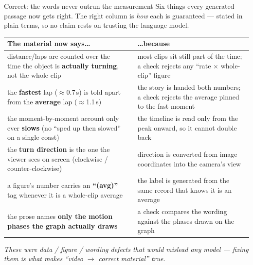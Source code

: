 \documentclass[aspectratio=169,10pt]{beamer}
\newcommand{\ok}{{\color{cApp}\textbf{\checkmark}}}
\newcommand{\takeaway}[1]{\vfill{\footnotesize\itshape\color{cGrey}#1\par}}
\begin{document}
\begin{frame}{Correct: the words never outrun the measurement}
\small
Six things every generated passage now gets right. The right column is \emph{how} each is guaranteed
--- stated in plain terms, so no claim rests on trusting the language model.
\vspace{0.3em}
\scriptsize
\renewcommand{\arraystretch}{1.45}
\begin{tabular}{@{}p{6.6cm}cp{5.6cm}@{}}
\toprule
\textbf{The material now says\ldots} & & \textbf{\ldots because} \\
\midrule
distance/laps are counted over the time the object is \textbf{actually turning}, not the whole clip &
\ok & most clips sit still part of the time; a check rejects any ``rate $\times$ whole-clip'' figure \\
the \textbf{fastest} lap ($\approx$0.7\,s) is told apart from the \textbf{average} lap ($\approx$1.1\,s) &
\ok & the story is handed both numbers; a check rejects the average pinned to the fast moment \\
the moment-by-moment account only ever \textbf{slows} (no ``sped up then slowed'' on a single coast) &
\ok & the timeline is read only from the peak onward, so it cannot double back \\
the \textbf{turn direction} is the one the viewer sees on screen (clockwise / counter-clockwise) &
\ok & direction is converted from image coordinates into the camera's view \\
a figure's number carries an \textbf{``(avg)''} tag whenever it is a whole-clip average &
\ok & the label is generated from the same record that knows it is an average \\
the prose names \textbf{only the motion phases the graph actually draws} &
\ok & a check compares the wording against the phases drawn on the graph \\
\bottomrule
\end{tabular}
\takeaway{These were data / figure / wording defects that would mislead any model --- fixing them is what
makes ``video $\to$ correct material'' true.}
\end{frame}
\end{document}
